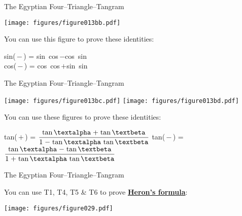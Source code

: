 \documentclass[14pt]{beamer}
\begin{document}
    \begin{frame}{The Egyptian Four--Triangle--Tangram}
        \begin{center}
            \texttt{[image: figures/figure013bb.pdf]}

            \bigskip
            You can use this figure to prove these identities:
            \bigskip

            {\small sin(\textalpha\,$-$\,\textbeta) = sin\,\textalpha\,\,cos\,\textbeta\;$-$\;cos\,\textalpha\,\,sin\,\textbeta\\[1ex]
            cos(\textalpha\,$-$\,\textbeta) = cos\,\textalpha\,\,cos\,\textbeta\;$+$\;sin\,\textalpha\,\,sin\,\textbeta\;}
        \end{center}
    \end{frame}


    \begin{frame}{The Egyptian Four--Triangle--Tangram}
        \begin{center}
            \texttt{[image: figures/figure013bc.pdf]}\qquad
            \texttt{[image: figures/figure013bd.pdf]}

            \bigskip
            You can use these figures to prove these identities:
            \bigskip

            {\footnotesize tan(\textalpha\,$+$\,\textbeta) = $\displaystyle\frac{\text{tan\,\textalpha\;$+$\;tan\,\textbeta}}{\text{1\;$-$\;tan\,\textalpha\,\,tan\,\textbeta}}$\qquad
            tan(\textalpha\,$-$\,\textbeta) = $\displaystyle\frac{\text{tan\,\textalpha\;$-$\;tan\,\textbeta}}{\text{1\;$+$\;tan\,\textalpha\,\,tan\,\textbeta}}$\\[5ex]}
        \end{center}
    \end{frame}


    \begin{frame}{The Egyptian Four--Triangle--Tangram}
        \begin{center}
            \vspace{-1.5ex}
            {\footnotesize You can use T1, T4, T5 \& T6 to prove \textbf{\href{https://en.wikipedia.org/wiki/Heron's_formula}{Heron's formula}}:}
            \bigskip            

            \texttt{[image: figures/figure029.pdf]}
        \end{center}
    \end{frame}
\end{document}
